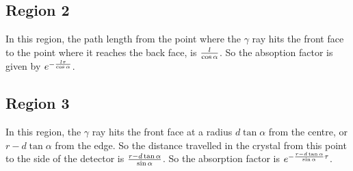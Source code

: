 \subsection{Region 2}

\noindent In this region, the path length from the point where the
$\gamma$ ray hits the front face to the point where it reaches the
back face, is $l \over \cos\alpha$. So the absoption factor is given
by $e^{-{l \tau \over \cos\alpha}}$.

\subsection{Region 3}

\noindent In this region, the $\gamma$ ray hits the front face at a
radius $d\tan\alpha$ from the centre, or $r - d\tan\alpha$ from the
edge. So the distance travelled in the crystal from this point to the
side of the detector is ${r - d\tan\alpha \over\sin\alpha}$. So the
absorption factor is $e^{-{r - d\tan\alpha \over\sin\alpha}\tau}$.
